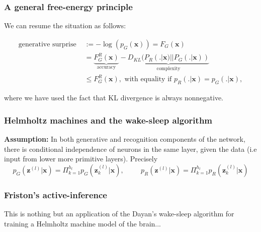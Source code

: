 \documentclass{article} %
\newtheorem{theorem}{Theorem} \newtheorem{lemma}[theorem]{Lemma}
\def\z{\mathbf{z}}
\def\x{\mathbf{x}}
\begin{document}
\subsubsection{A general free-energy principle}
We can resume the situation as follows:
\begin{mdframed}
\begin{equation}
  \begin{split}
    \text{generative surprise } &:= -\log(p_G(\x)) = F_G(\x) \\
    &=\underbrace{F^R_G(\x)}_{\text{accuracy}} - \underbrace{D_{KL}(P_R(.|\x) || P_G(.|\x))}_{\text{complexity}} \\
    &\le F^R_G(\x),
    \text{ with equality if }p_R(.|\x) = p_G(.|\x),
    \end{split}
\end{equation}
\end{mdframed}
where we have used the fact that KL divergence is always nonnegative.

\subsubsection{Helmholtz machines and the wake-sleep algorithm}
  \textbf{Assumption:} In both generative and recognition components of the network, there is conditional independence of  neurons in the same layer, given the data (i.e input from lower more primitive layers). Precisely
$$
p_G(\z^{(l)}|\x) = \Pi_{k=1}^{h_l}p_G(\z_k^{(l)} | \x),\hspace{1cm}
p_R(\z^{(l)}|\x) = \Pi_{k=1}^{h_l}p_R(\z_k^{(l)} |\x)
$$

\subsubsection{Friston's active-inference}
This is nothing but an application of the Dayan's wake-sleep algorithm for training a Helmholtz machine model of the brain...
\end{document}
